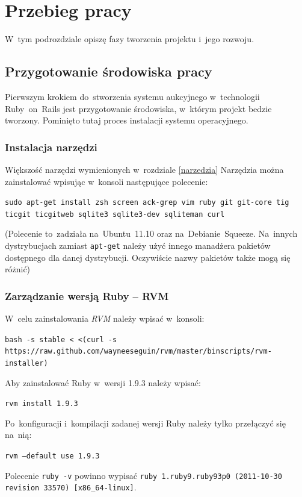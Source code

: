 \section{Przebieg pracy}

W~tym podrozdziale opiszę fazy tworzenia projektu i~jego rozwoju.

\subsection{Przygotowanie środowiska pracy}

Pierwszym krokiem do~stworzenia systemu aukcyjnego w~technologii Ruby~on~Rails jest przygotowanie środowiska, w~którym projekt bedzie tworzony. Pominięto tutaj proces instalacji systemu operacyjnego.

\subsubsection{Instalacja narzędzi}

Większość narzędzi wymienionych w~rozdziale \ref{narzedzia} Narzędzia można zainstalować wpisując w~konsoli następujące polecenie:


\texttt{sudo apt-get install zsh screen ack-grep vim ruby git git-core tig ticgit ticgitweb sqlite3 sqlite3-dev sqliteman curl}


(Polecenie to~zadziała na~Ubuntu~11.10 oraz na~Debianie~Squeeze. Na~innych dystrybucjach zamiast \texttt{apt-get} należy użyć innego manadżera pakietów dostępnego dla danej dystrybucji. Oczywiście nazwy pakietów także mogą się różnić)

\subsubsection{Zarządzanie wersją Ruby -- RVM}

W~celu zainstalowania \textit{RVM} należy wpisać w~konsoli:


\verb+bash -s stable < <(curl -s https://raw.github.com/wayneeseguin/rvm/master/binscripts/rvm-installer)+


Aby zainstalować Ruby w~wersji 1.9.3 należy wpisać:


\verb+rvm install 1.9.3+


Po~konfiguracji i~kompilacji zadanej wersji Ruby należy tylko przełączyć się na~nią:


\texttt{rvm --default use 1.9.3}


Polecenie \texttt{ruby -v} powinno wypisać \texttt{ruby 1.ruby9.ruby93p0 (2011-10-30 revision 33570) [x86\_64-linux]}.

